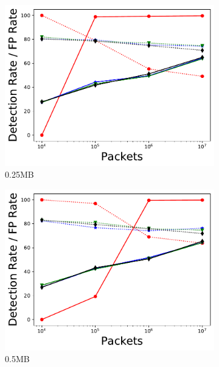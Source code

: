 \begin{figure}[p]
\begin{subfigure}[t]{0.32\textwidth}
    \includegraphics[width=\linewidth]{figures/DR_FPR_per_pkts_m=0.25.pdf}
    \caption{0.25MB}
    \label{fig:fig2_d}
\end{subfigure}\hfill
\begin{subfigure}[t]{0.32\textwidth}
    \includegraphics[width=\linewidth]{figures/DR_FPR_per_pkts_m=0.5.pdf}
    \caption{0.5MB}
    \label{fig:fig2_e}
\end{subfigure}\hfill
\begin{subfigure}[t]{0.32\textwidth}

\end{subfigure}
\end{figure}
